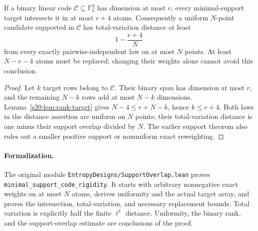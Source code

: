 \begin{theorem}\label{s20:thm:rank-overlap}
If a binary linear code $\mathcal C\subseteq\mathbb F_2^d$ has
dimension at most $r$, every minimal-support target intersects it in
at most $r+4$ atoms. Consequently a uniform $N$-point candidate
supported in $\mathcal C$ has total-variation distance at least
\[
 1-\frac{r+4}{N}
\]
from every exactly pairwise-independent law on at most $N$ points.
At least $N-r-4$ atoms must be replaced; changing their weights alone
cannot avoid this conclusion.
\end{theorem}
\begin{proof}
Let $k$ target rows belong to $\mathcal C$. Their binary span has
dimension at most $r$, and the remaining $N-k$ rows add at most
$N-k$ dimensions. Lemma~\ref{s20:lem:rank-target} gives
$N-4\le r+N-k$, hence $k\le r+4$.
Both laws in the distance assertion are uniform on $N$ points;
their total-variation distance is one minus their support overlap
divided by $N$. The earlier support theorem also rules out a smaller
positive support or nonuniform exact reweighting.
\end{proof}

\paragraph{Formalization.}
The original module \texttt{EntropyDesigns/\allowbreak SupportOverlap.lean}
proves \texttt{minimal\_\allowbreak support\_\allowbreak code\_\allowbreak rigidity}.
It starts with arbitrary nonnegative exact weights on at most $N$ atoms,
derives uniformity and the actual target array, and proves the intersection,
total-variation, and necessary replacement bounds. Total variation is
explicitly half the finite $\ell^1$ distance. Uniformity, the binary rank,
and the support-overlap estimate are conclusions of the proof.

